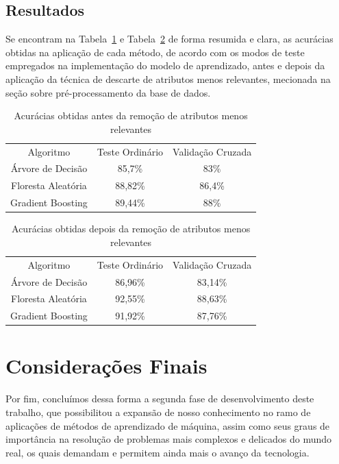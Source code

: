 \documentclass[12pt]{article}
\begin{document}
\subsection{Resultados}

Se encontram na Tabela~\ref{tab:exampleTab4} e Tabela~\ref{tab:exampleTab5} de forma resumida e clara, as acurácias obtidas na aplicação de cada método, de acordo com os modos de teste empregados na implementação do modelo de aprendizado, antes e depois da aplicação da técnica de descarte de atributos menos relevantes, mecionada na seção sobre pré-processamento da base de dados.

\begin{table}[H]
    \centering
    \caption{Acurácias obtidas antes da remoção de atributos menos relevantes}
    \label{tab:exampleTab4}
    \begin{tabular}{c|c|c}
        Algoritmo & Teste Ordinário & Validação Cruzada \\ 
        Árvore de Decisão & 85,7\% & 83\%\\
        Floresta Aleatória & 88,82\% & 86,4\%\\
        Gradient Boosting & 89,44\% & 88\%
    \end{tabular}
\end{table}

\begin{table}[H]
    \centering
    \caption{Acurácias obtidas depois da remoção de atributos menos relevantes}
    \label{tab:exampleTab5}
    \begin{tabular}{c|c|c}
        Algoritmo & Teste Ordinário & Validação Cruzada \\ 
        Árvore de Decisão & 86,96\% & 83,14\%\\
        Floresta Aleatória & 92,55\% & 88,63\%\\
        Gradient Boosting & 91,92\% & 87,76\%
    \end{tabular}
\end{table}

\section{Considerações Finais}

Por fim, concluímos dessa forma a segunda fase de desenvolvimento deste trabalho, que possibilitou a expansão de nosso conhecimento no ramo de aplicações de métodos de aprendizado de máquina, assim como seus graus de importância na resolução de problemas mais complexos e delicados do mundo real, os quais demandam e permitem ainda mais o avanço da tecnologia.
\end{document}
